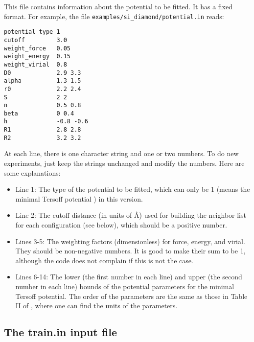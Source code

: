 \documentclass[12pt,a4paper]{report}
\begin{document}
This file contains information about the potential to be fitted. It has a fixed format. For example, the file \verb"examples/si_diamond/potential.in" reads:
\begin{verbatim}
potential_type 1
cutoff         3.0
weight_force   0.05
weight_energy  0.15
weight_virial  0.8
D0             2.9 3.3
alpha          1.3 1.5
r0             2.2 2.4
S              2 2
n              0.5 0.8
beta           0 0.4
h              -0.8 -0.6
R1             2.8 2.8
R2             3.2 3.2
\end{verbatim}
At each line, there is one character string and one or two numbers. To do new experiments, just keep the strings unchanged and modify the numbers. Here are some explanations:
\begin{itemize}
\item Line 1: The type of the potential to be fitted, which can only be 1  (means the minimal Tersoff potential \cite{fan2019arxiv}) in this version.
\item Line 2: The cutoff distance (in units of \AA) used for building the neighbor list for each configuration (see below), which should be a positive number.
\item Lines 3-5: The weighting factors (dimensionless) for force, energy, and virial. They should be non-negative numbers. It is good to make their sum to be 1, although the code does not complain if this is not the case.
\item Lines 6-14: The lower (the first number in each line) and upper (the second number in each line) bounds of the potential parameters for the minimal Tersoff potential. The order of the parameters are the same as those in Table II of \cite{fan2019arxiv}, where one can find the units of the parameters. 
\end{itemize}


\subsection{The train.in input file}
\end{document}
